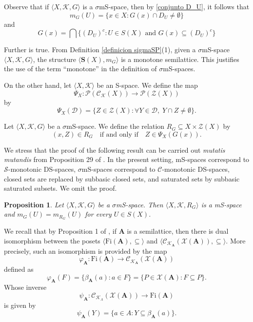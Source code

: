 \documentclass{article}
\newtheorem{proposition}{\bf Proposition}[section]
\begin{document}
Observe that if $\langle X, \mathcal{K}, G \rangle$ is a $\sigma$mS-space, then by \eqref{conjunto D_U}, it follows that 
\[m_G(U) = \{ x \in X \colon G(x)\cap D_U\neq \emptyset\}\]
and 
\[
G(x) = \bigcap\{ (D_U)^{c} \colon U \in S(X) \text{ and } G(x)\subseteq (D_U)^{c} \}
\]

Further is true. From Definition \ref{definicion sigmaSP}(1), given a $\sigma$mS-space $\langle X, \mathcal{K}, G \rangle$, the structure $\langle \mathbf{S}(X), m_G \rangle$ is a monotone semilattice. This justifies the use of the term ``monotone'' in the definition of $\sigma$mS-spaces.


On the other hand, let $\langle X, \mathcal{K}\rangle$ be an S-space. We define the map 
\[
\Psi_X : \mathcal{P}(\mathcal{C}_{\mathcal{K}}(X)) \to \mathcal{P}(\mathcal{Z}(X))
\]
by
\begin{equation}\label{def. psi}
\Psi_X(\mathcal{D}) = \{ Z \in \mathcal{Z}(X) : \forall Y \in \mathcal{D},\; Y \cap Z \neq \emptyset \}.
\end{equation}

Let $\langle X, \mathcal{K}, G \rangle$ be a $\sigma$mS-space. We define the relation $R_G \subseteq X \times \mathcal{Z}(X)$ by
\[
(x,Z) \in R_G \quad \text{if and only if} \quad Z \in \Psi_X(G(x)).
\]

We stress that the proof of the following result can be carried out \emph{mutatis mutandis} from Proposition 29 of \cite{CM}. In the present setting, mS-spaces correspond to $\mathcal{S}$-monotonic DS-spaces, $\sigma$mS-spaces correspond to $\mathcal{C}$-monotonic DS-spaces, closed sets are replaced by subbasic closed sets, and saturated sets by subbasic saturated subsets. We omit the proof.

\begin{proposition}\label{R_G y G_R}
Let $\langle X, \mathcal{K}, G \rangle$ be a $\sigma$mS-space. Then $\langle X, \mathcal{K}, R_G\rangle$ is a mS-space and $m_G(U) = m_{R_G}(U)$ for every $U \in S(X)$.
\end{proposition}

We recall that by Proposition 1 of \cite{P W}, if $\mathbf{A}$ is a semilattice, then there is dual isomorphism between the posets $\langle \mathrm{Fi}(\mathbf{A}), \subseteq \rangle$ and $\langle \mathcal{C}_{\mathcal{K}_\mathbf{A}}(\mathcal{X}(\mathbf{A})),\subseteq \rangle$. More precisely, such an isomorphism is provided by the map
\[
\varphi_{\mathbf{A}} : \mathrm{Fi}(\mathbf{A})\to \mathcal{C}_{\mathcal{K}_\mathbf{A}}(\mathcal{X}(\mathbf{A}))
\]
defined as
\[
\varphi_{\mathbf{A}}(F)=\{\beta_{\mathbf{A}}(a):a\in F\}=\{P\in \mathcal{X}(\mathbf{A}):F\subseteq P\}.
\]
Whose inverse
\[
\psi_{\mathbf{A}}:\mathcal{C}_{\mathcal{K}_A}(\mathcal{X}(\mathbf{A}))\to \mathrm{Fi}(\mathbf{A})
\]
is given by
\[
\psi_{\mathbf{A}}(Y)=\{a\in A:Y\subseteq \beta_{\mathbf{A}}(a)\}.
\]
\end{document}
